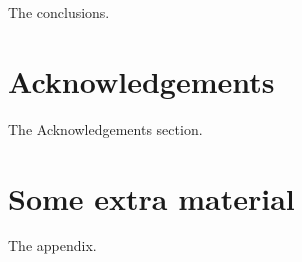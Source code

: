 \documentclass[a4paper,fleqn,usenatbib]{mnras}
\begin{document}
The conclusions.

\section*{Acknowledgements}

The Acknowledgements section.






\appendix

\section{Some extra material}

The appendix.



\bsp	%
\label{lastpage}
\end{document}
